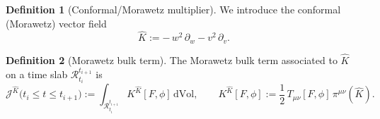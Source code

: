 \documentclass[11pt]{article}
\numberwithin{equation}{section}
\theoremstyle{plain}
\theoremstyle{definition}
\newtheorem{definition}{Definition}[section]
\theoremstyle{remark}
\begin{document}
\begin{definition}[Conformal/Morawetz multiplier]\label{def:morawetz-multiplier}
We introduce the conformal (Morawetz) vector field
\begin{equation}\label{eq:K-morawetz}
\hat K := -\,w^{2}\,\partial_{w}-v^{2}\,\partial_{v}.
\end{equation}
\end{definition}

\begin{definition}[Morawetz bulk term]\label{def:morawetz-bulk}
The Morawetz bulk term associated to $\hat K$ on a time slab $\mathcal R_{t_i}^{t_{i+1}}$ is
\begin{equation}\label{eq:JK-bulk}
\mathcal{J}^{\hat{K}}\bigl(t_i\le t\le t_{i+1}\bigr)
:=
\int_{\mathcal R_{t_i}^{t_{i+1}}} K^{\hat K}[F,\phi]\,\text{dVol},
\qquad
K^{\hat K}[F,\phi]:=\frac12\,T_{\mu\nu}[F,\phi]\,\pi^{\mu\nu}(\hat K).
\end{equation}
\end{definition}
\end{document}
